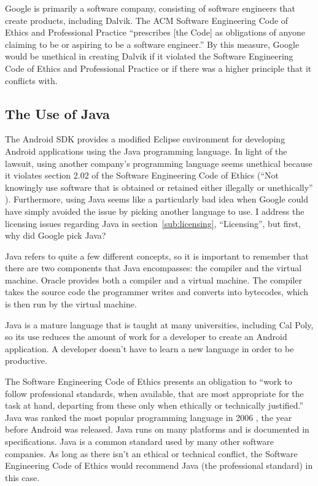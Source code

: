 \documentclass[11pt]{article}
\begin{document}
\begin{multicols}{2}
Google is primarily a software company, consisting of software engineers that
create products, including Dalvik.  The ACM Software Engineering Code of Ethics
and Professional Practice ``prescribes [the Code] as obligations of anyone
claiming to be or aspiring to be a software engineer.'' \cite{secode} By this
measure, Google would be unethical in creating Dalvik if it violated the
Software Engineering Code of Ethics and Professional Practice \cite{secode} or
if there was a higher principle that it conflicts with.


\subsection{The Use of Java} %
\label{sub:java}

The Android SDK provides a modified Eclipse environment for developing Android
applications using the Java programming language.  In light of the lawsuit,
using another company's programming language seems unethical because it violates
section 2.02 of the Software Engineering Code of Ethics (``Not knowingly use
software that is obtained or retained either illegally or unethically'' \cite[\S
2.02]{secode}).  Furthermore, using Java seems like a particularly bad idea when
Google could have simply avoided the issue by picking another language to use.
I address the licensing issues regarding Java in section~\ref{sub:licensing},
``Licensing'', but first, why did Google pick Java?

Java refers to quite a few different concepts, so it is important to remember
that there are two components that Java encompasses: the compiler and the
virtual machine.  Oracle provides both a compiler and a virtual machine.  The
compiler takes the source code the programmer writes and converts into
bytecodes, which is then run by the virtual machine.

Java is a mature language that is taught at many universities, including Cal
Poly, so its use reduces the amount of work for a developer to create an Android
application.  A developer doesn't have to learn a new language in order to be
productive.

The Software Engineering Code of Ethics presents an obligation to
``work to follow professional standards, when available, that are most
appropriate for the task at hand, departing from these only when ethically or
technically justified.'' \cite[\S 3.06]{secode}  Java was ranked the most
popular programming language in 2006 \cite[Long term trends]{tiobe}, the year
before Android was released.  Java runs on many platforms and is documented in
specifications.  Java is a common standard used by many other software
companies.  As long as there isn't an ethical or technical conflict, the
Software Engineering Code of Ethics would recommend Java (the professional
standard) in this case.


\end{multicols}
\end{document}
